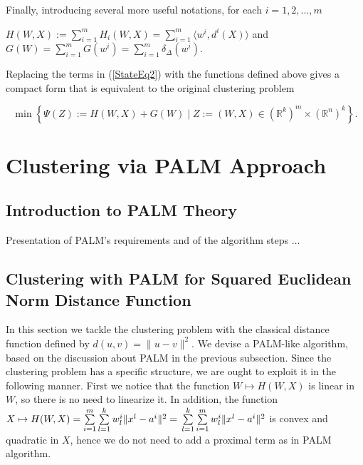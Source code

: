 \documentclass[11pt]{article}
\numberwithin{equation}{section}
\begin{document}
Finally, introducing several more useful notations, for each $i=1, 2, \ldots , m$
\begin{center}
$H(W,X) := \sum\limits_{i=1}^{m} H_i(W,X) = \sum\limits_{i=1}^{m} \langle w^i , d^i(X) \rangle$ and $G(W) = \sum\limits_{i=1}^{m} G(w^i) = \sum\limits_{i=1}^{m} \delta_{\Delta}(w^i) .$
\\
\end{center}

Replacing the terms in (\ref{StateEq2}) with the functions defined above gives a compact form that is equivalent to the original clustering problem

\begin{equation}
	\min \left\lbrace \Psi(Z) := H(W,X) + G(W) \mid Z := (W,X) \in (\mathbb{R}^k)^m \times (\mathbb{R}^n)^k \right\rbrace . \label{StateEq4}
\end{equation}


\section{Clustering via PALM Approach}

\subsection{Introduction to PALM Theory}

Presentation of PALM's requirements and of the algorithm steps  $\ldots$


\subsection{Clustering with PALM for Squared Euclidean Norm Distance Function}

In this section we tackle the clustering problem with the classical distance function defined by $d(u,v) = \|u-v\|^2$. We devise a PALM-like algorithm, based on the discussion about PALM in the previous subsection.
Since the clustering problem has a specific structure, we are ought to exploit it in the following manner.
First we notice that the function 
$W \mapsto H(W,X)$ is linear in $W$, so there is no need to linearize it. In addition, the function 
$X \mapsto H(W,X) = 
\sum\limits_{i=1}^{m} \sum\limits_{l=1}^{k} w^i_l \|x^l - a^i\|^2 =
\\ \sum\limits_{l=1}^{k} \sum\limits_{i=1}^{m} w^i_l \|x^l - a^i\|^2$ is convex and quadratic in $X$, hence we do not need to add a proximal term as in PALM algorithm.
\end{document}
